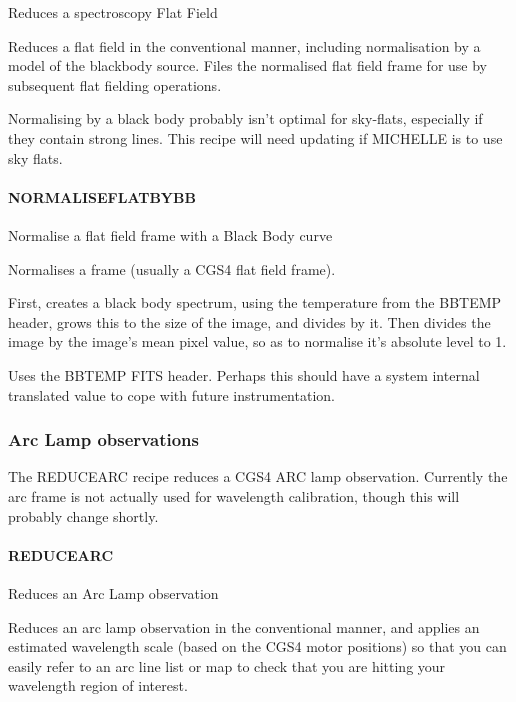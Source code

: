\documentclass[twoside,11pt]{article}
\renewcommand{\_}{\texttt{\symbol{95}}}
\begin{document}
Reduces a spectroscopy Flat Field


\mbox{}

Reduces a flat field in the conventional manner, including
normalisation by a model of the blackbody source. Files the normalised
flat field frame for use by subsequent flat fielding operations.

Normalising by a black body probably isn't optimal for sky-flats,
especially if they contain strong lines.
This recipe will need updating if MICHELLE is to use sky flats.


\paragraph*{\_NORMALISE\_FLAT\_BY\_BB\_\label{_NORMALISE_FLAT_BY_BB_}}

Normalise a flat field frame with a Black Body curve

\mbox{}

Normalises a frame (usually a CGS4 flat field frame).



First, creates a black body spectrum, using the temperature from the
BBTEMP header, grows this to the size of the image, and divides by
it. Then divides the image by the image's mean pixel value, so as to
normalise it's absolute level to 1.

Uses the BBTEMP FITS header. Perhaps this should have a system internal
translated value to cope with future instrumentation.



\subsubsection{Arc Lamp observations}

The REDUCE\_ARC recipe reduces a CGS4 ARC lamp observation. Currently
the arc frame is not actually used for wavelength calibration, though
this will probably change shortly.

\paragraph*{REDUCE\_ARC\label{REDUCE_ARC}}

Reduces an Arc Lamp observation


\mbox{}

Reduces an arc lamp observation in the conventional manner, and
applies an estimated wavelength scale (based on the CGS4 motor
positions) so that you can easily refer to an arc line list or map to
check that you are hitting your wavelength region of interest.
\end{document}
